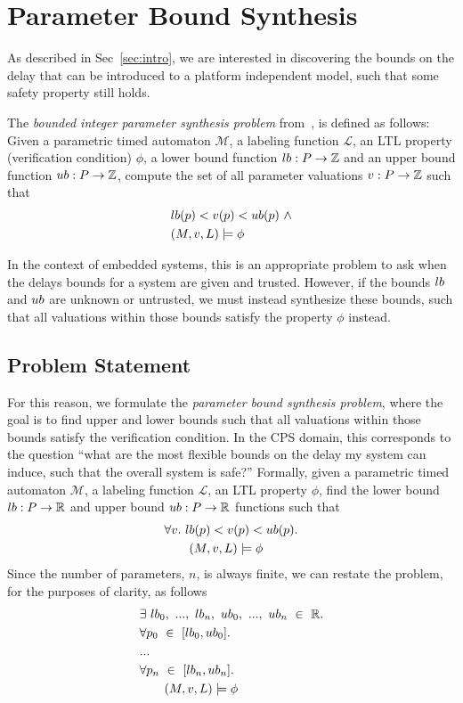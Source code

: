 \section{Parameter Bound Synthesis}
 
As described in Sec~\ref{sec:intro}, we are interested in discovering the bounds on the delay that can be introduced to a platform independent model, such that some safety property still holds.

The \textit{bounded integer parameter synthesis problem} from~\cite{BBHBC14}, is defined as follows:
Given a parametric timed automaton $\mathcal{M}$, a labeling function $\mathcal{L}$, an LTL property (verification condition) $\phi$, a lower bound function $lb: P \to \mathbb{Z}$ and an upper bound function $ub: P \to \mathbb{Z} $, compute the set of all parameter valuations $v: P \to \mathbb{Z}$ such that 
\begin{align*}
  &lb(p) < v(p) < ub(p)\ \land \\
  &(M,v,L) \models \phi
\end{align*}

In the context of embedded systems, this is an appropriate problem to ask when the delays bounds for a system are given and trusted.
However, if the bounds $lb$ and $ub$ are unknown or untrusted, we must instead synthesize these bounds, such that all valuations within those bounds satisfy the property $\phi$ instead.

\subsection{Problem Statement}
For this reason, we formulate the \textit{parameter bound synthesis problem}, where the goal is to find upper and lower bounds such that all valuations within those bounds satisfy the verification condition.
In the CPS domain, this corresponds to the question ``what are the most flexible bounds on the delay my system can induce, such that the overall system is safe?''
Formally, given a parametric timed automaton $\mathcal{M}$, a labeling function $\mathcal{L}$, an LTL property $\phi$, 
find the lower bound $lb: P \to \mathbb{R}$ and upper bound $ub : P \to \mathbb{R}$ functions such that 
\begin{align*}
  &\forall v.\ lb(p) < v(p) < ub(p).\\
  &\qquad (M, v,L) \models \phi
\end{align*}
Since the number of parameters, $n$, is always finite, we can restate the problem, for the purposes of clarity, as follows
\begin{align*}
  &\exists \ lb_0,\ ...,\ lb_n,\ ub_0,\ ...,\ ub_n \ \in \ \mathbb{R} .\\
  &\forall p_0 \ \in \ [lb_0, ub_0].\\
  &...\\
  &\forall p_n \ \in \ [lb_n, ub_n].\\
  &\qquad (M, v, L) \models \phi
\end{align*}

